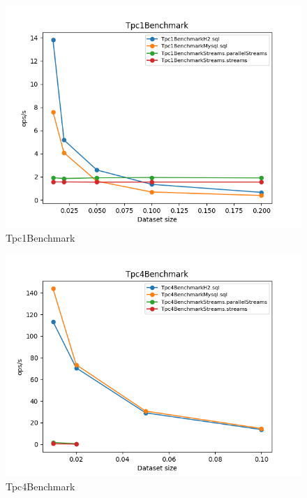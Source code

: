 \documentclass[12pt]{extarticle}
\begin{document}
\begin{figure}[H]
\centering
\includegraphics[width=13cm]{plots/Tpc1Benchmark}
\caption{Tpc1Benchmark}
\end{figure}

\begin{figure}[H]
\centering
\includegraphics[width=13cm]{plots/Tpc4Benchmark}
\caption{Tpc4Benchmark}
\end{figure}
\end{document}
